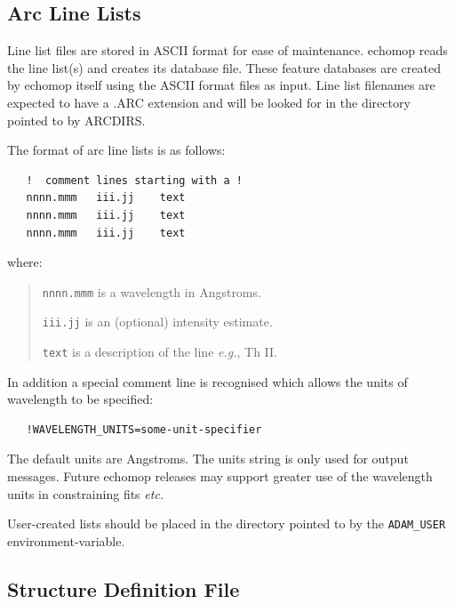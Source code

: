 \documentclass[11pt,twoside]{article}
\newcommand{\xlabel}[1]{}
\newcommand{\mlabel}[1]{\xlabel{#1}\label{#1}}
\newcommand{\myindex}[1]{\index{#1}}
\renewcommand{\myindex}[1]{}
\begin{document}
\subsection{\mlabel{arc_line_lists}Arc Line Lists}
\myindex{Arc line lists!format}

Line list files are stored in ASCII format for ease of maintenance.
{\sc echomop} reads the line list(s) and creates its database file. These
feature databases are created by {\sc echomop} itself using the ASCII format
files as input. Line list filenames are expected to have a .ARC
extension and will be looked for in the directory pointed to by ARCDIRS.

The format of arc line lists is as follows:

\begin{verbatim}
   !  comment lines starting with a !
   nnnn.mmm   iii.jj    text
   nnnn.mmm   iii.jj    text
   nnnn.mmm   iii.jj    text
\end{verbatim}

where:

\begin{quote}

   {\tt nnnn.mmm}   is a wavelength in Angstroms.

   {\tt iii.jj}     is an (optional) intensity estimate.

   {\tt text}       is a description of the line {\it{e.g.}}, Th II.

\end{quote}

In addition a special comment line is recognised which allows the units
of wavelength to be specified:

\begin{verbatim}
   !WAVELENGTH_UNITS=some-unit-specifier
\end{verbatim}

The default units are Angstroms.  The units string is only used for output
messages.  Future {\sc echomop} releases may support greater use of the
wavelength units in constraining fits {\it etc.}

User-created lists should be placed in the directory pointed to by the
\texttt{ADAM\_USER} environment-variable.


\subsection{\mlabel{structure_definition_file}Structure Definition File}
\myindex{Structure definition files}
\end{document}
